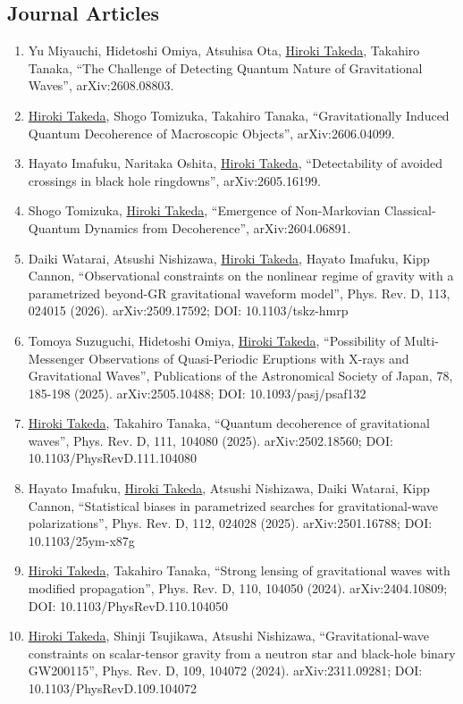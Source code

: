 \documentclass[uplatex, 12pt]{article}
\begin{document}
\subsection*{Journal Articles}
\begin{enumerate}
\item Yu Miyauchi, Hidetoshi Omiya, Atsuhisa Ota, \uline{Hiroki Takeda}, Takahiro Tanaka, “The Challenge of Detecting Quantum Nature of Gravitational Waves”, arXiv:2608.08803.
\item \uline{Hiroki Takeda}, Shogo Tomizuka, Takahiro Tanaka, “Gravitationally Induced Quantum Decoherence of Macroscopic Objects”, arXiv:2606.04099.
\item Hayato Imafuku, Naritaka Oshita, \uline{Hiroki Takeda}, “Detectability of avoided crossings in black hole ringdowns”, arXiv:2605.16199.
\item Shogo Tomizuka, \uline{Hiroki Takeda}, “Emergence of Non-Markovian Classical-Quantum Dynamics from Decoherence”, arXiv:2604.06891.
\item Daiki Watarai, Atsushi Nishizawa, \uline{Hiroki Takeda}, Hayato Imafuku, Kipp Cannon, “Observational constraints on the nonlinear regime of gravity with a parametrized beyond-GR gravitational waveform model”, Phys. Rev. D, 113, 024015 (2026). arXiv:2509.17592; DOI: 10.1103/tskz-hmrp
\item Tomoya Suzuguchi, Hidetoshi Omiya, \uline{Hiroki Takeda}, “Possibility of Multi-Messenger Observations of Quasi-Periodic Eruptions with X-rays and Gravitational Waves”, Publications of the Astronomical Society of Japan, 78, 185-198 (2025). arXiv:2505.10488; DOI: 10.1093/pasj/psaf132
\item \uline{Hiroki Takeda}, Takahiro Tanaka, “Quantum decoherence of gravitational waves”, Phys. Rev. D, 111, 104080 (2025). arXiv:2502.18560; DOI: 10.1103/PhysRevD.111.104080
\item Hayato Imafuku, \uline{Hiroki Takeda}, Atsushi Nishizawa, Daiki Watarai, Kipp Cannon, “Statistical biases in parametrized searches for gravitational-wave polarizations”, Phys. Rev. D, 112, 024028 (2025). arXiv:2501.16788; DOI: 10.1103/25ym-x87g
\item \uline{Hiroki Takeda}, Takahiro Tanaka, “Strong lensing of gravitational waves with modified propagation”, Phys. Rev. D, 110, 104050 (2024). arXiv:2404.10809; DOI: 10.1103/PhysRevD.110.104050
\item \uline{Hiroki Takeda}, Shinji Tsujikawa, Atsushi Nishizawa, “Gravitational-wave constraints on scalar-tensor gravity from a neutron star and black-hole binary GW200115”, Phys. Rev. D, 109, 104072 (2024). arXiv:2311.09281; DOI: 10.1103/PhysRevD.109.104072

\end{enumerate}
\end{document}
